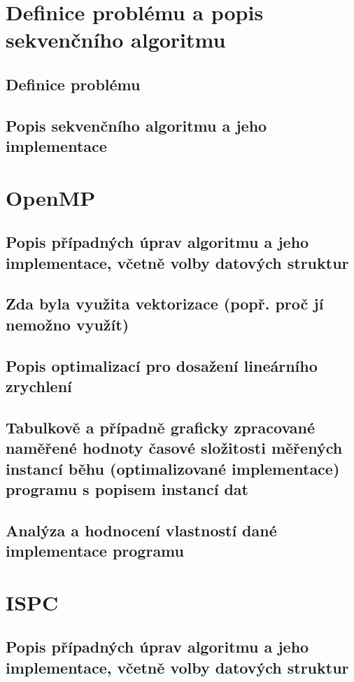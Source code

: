 \documentclass[12pt,a4paper]{article}
\begin{document}
\clearpage
\tableofcontents
\clearpage

\section{Definice problému a popis sekvenčního algoritmu}
\subsection{Definice problému}
\subsection{Popis sekvenčního algoritmu a jeho implementace}


\section{OpenMP}
\subsection{Popis případných úprav algoritmu a jeho implementace, včetně volby datových struktur}
\subsection{Zda byla využita vektorizace (popř. proč jí nemožno využít)}
\subsection{Popis optimalizací pro dosažení lineárního zrychlení}
\subsection{Tabulkově a případně graficky zpracované naměřené hodnoty časové složitosti měřených instancí běhu (optimalizované implementace) programu s popisem instancí dat}
\subsection{Analýza a hodnocení vlastností dané implementace programu}


\section{ISPC}
\subsection{Popis případných úprav algoritmu a jeho implementace, včetně volby datových struktur}
\end{document}
